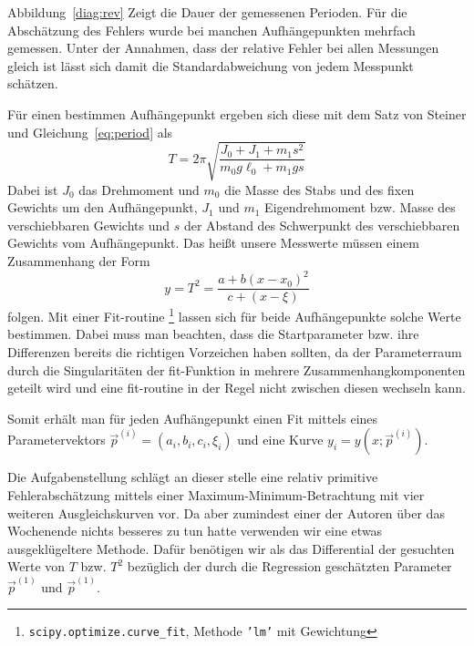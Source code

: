 \noindent
Abbildung~\ref{diag:rev} Zeigt die Dauer der gemessenen Perioden. Für die Abschätzung des Fehlers wurde bei manchen Aufhängepunkten mehrfach gemessen. Unter der Annahmen, dass der relative Fehler bei allen Messungen gleich ist lässt sich damit die Standardabweichung von jedem Messpunkt schätzen.

Für einen bestimmen Aufhängepunkt ergeben sich diese mit dem Satz von Steiner und Gleichung~\ref{eq:period} als
\[
    T = 2 \pi \sqrt{\frac{J_0 + J_1 + m_1 s^2}{m_0 g \ell_0 + m_1 g s}}
\]
Dabei ist $J_0$ das Drehmoment und $m_0$ die Masse des Stabs und des fixen Gewichts um den Aufhängepunkt, $J_1$ und $m_1$ Eigendrehmoment bzw. Masse des verschiebbaren Gewichts und $s$ der Abstand des Schwerpunkt des verschiebbaren Gewichts vom Aufhängepunkt. Das heißt unsere Messwerte müssen einem Zusammenhang der Form
\[
    y = T^2 = \frac{a + b (x - x_0)^2}{c + (x - \xi)}
\]
folgen. Mit einer Fit-routine%
\footnote{\texttt{scipy.optimize.curve\_fit}, Methode \texttt{'lm'} mit Gewichtung}
lassen sich für beide Aufhängepunkte solche Werte bestimmen. Dabei muss man beachten, dass die Startparameter bzw. ihre Differenzen bereits die richtigen Vorzeichen haben sollten, da der Parameterraum durch die Singularitäten der fit-Funktion in mehrere Zusammenhangkomponenten geteilt wird und eine fit-routine in der Regel nicht zwischen diesen wechseln kann.

Somit erhält man für jeden Aufhängepunkt einen Fit mittels eines Parametervektors $\vec{p}^{(i)} = (a_i, b_i, c_i, \xi_i)$ und eine Kurve $y_i = y(x; \vec{p}^{(i)})$.

Die Aufgabenstellung schlägt an dieser stelle eine relativ primitive Fehlerabschätzung mittels einer Maximum-Minimum-Betrachtung mit vier weiteren Ausgleichskurven vor. Da aber zumindest einer der Autoren über das Wochenende nichts besseres zu tun hatte verwenden wir eine etwas ausgeklügeltere Methode. Dafür benötigen wir als das Differential der gesuchten Werte von $T$ bzw. $T^2$ bezüglich der durch die Regression geschätzten Parameter $\vec{p}^{(1)}$ und $\vec{p}^{(1)}$.

